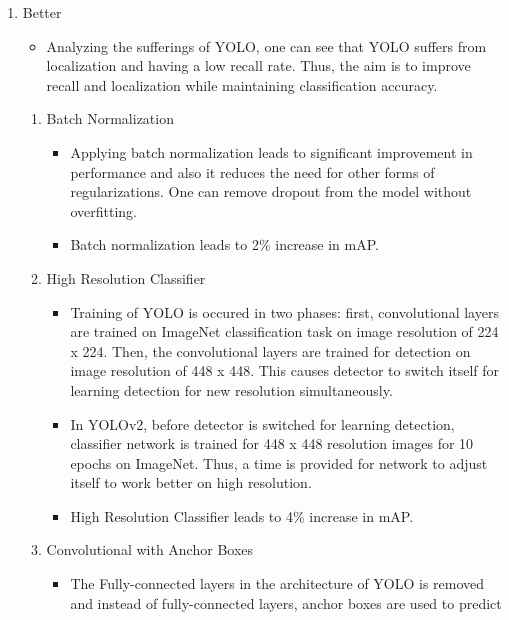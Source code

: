 \documentclass{article}
\begin{document}
\begin{enumerate}
    \item Better
    \begin{itemize}
        \item Analyzing the sufferings of YOLO, one can see that YOLO suffers from 
        localization and having a low recall rate. Thus, the aim is to improve 
        recall and localization while maintaining classification accuracy.
    \end{itemize}
    \begin{enumerate}
        \item Batch Normalization
        \begin{itemize}
            \item Applying batch normalization leads to significant improvement in 
            performance and also it reduces the need for other forms of 
            regularizations. One can remove dropout from the model without 
            overfitting.
            \item Batch normalization leads to 2\% increase in mAP.
        \end{itemize}
        \item High Resolution Classifier
        \begin{itemize}
            \item Training of YOLO is occured in two phases: first, convolutional 
            layers are trained on ImageNet classification task on image resolution 
            of 224 x 224. Then, the convolutional layers are trained for detection 
            on image resolution of 448 x 448. This causes detector to switch itself 
            for learning detection for new resolution simultaneously.
            \item In YOLOv2, before detector is switched for learning detection, 
            classifier network is trained for 448 x 448 resolution images for 10 
            epochs on ImageNet. Thus, a time is provided for network to adjust 
            itself to work better on high resolution.
            \item High Resolution Classifier leads to 4\% increase in mAP.
        \end{itemize}
        \item Convolutional with Anchor Boxes
        \begin{itemize}
            \item The Fully-connected layers in the architecture of YOLO is removed 
        and instead of fully-connected layers, anchor boxes are used to predict 

\end{itemize}
\end{enumerate}
\end{enumerate}
\end{document}
